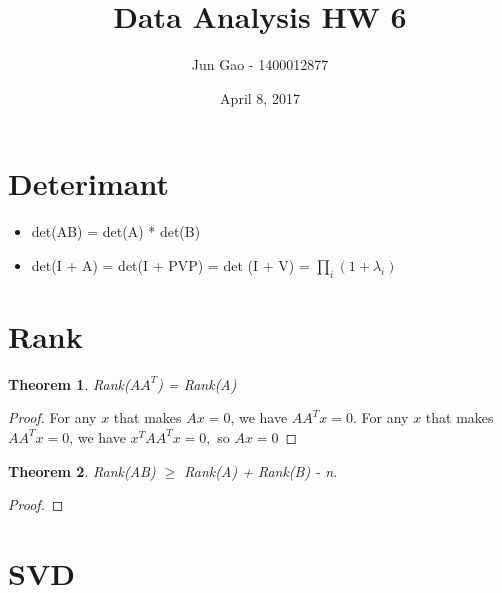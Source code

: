 \documentclass[12pt]{article}
\newtheorem{theorem}{Theorem}
\begin{document}
 
\title{Data Analysis HW 6}
\author{Jun Gao - 1400012877}
\date{April 8, 2017}

\maketitle
\section{Deterimant}
\begin{itemize}
\item det(AB) = det(A) * det(B)
\item det(I + A) = det(I + PVP) = det (I + V) = $\prod_i (1 + \lambda_i)$
\end{itemize}
 

\section{Rank}
\begin{theorem}
	Rank($AA^T$) = Rank(A)
\end{theorem}
\begin{proof}
	For any $x$ that makes $Ax=0$, we have $AA^Tx=0$. For any $x$ that makes $AA^Tx=0$, we have $x^TAA^Tx=0,$ so $Ax=0$
\end{proof}
\begin{theorem}
	Rank(AB) $\ge$ Rank(A) + Rank(B) - n.
\end{theorem}
\begin{proof}
	
\end{proof}
\section{SVD}
\end{document}
